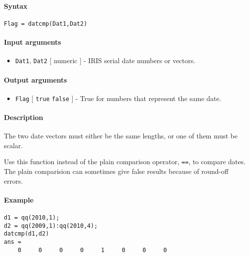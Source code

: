 


	\paragraph{Syntax}

\begin{verbatim}
Flag = datcmp(Dat1,Dat2)
\end{verbatim}

\paragraph{Input arguments}

\begin{itemize}
\itemsep1pt\parskip0pt
\item
  \texttt{Dat1}, \texttt{Dat2} {[} numeric {]} - IRIS serial date
  numbers or vectors.
\end{itemize}

\paragraph{Output arguments}

\begin{itemize}
\itemsep1pt\parskip0pt
\item
  \texttt{Flag} {[} \texttt{true} \textbar{} \texttt{false} {]} - True
  for numbers that represent the same date.
\end{itemize}

\paragraph{Description}

The two date vectors must either be the same lengths, or one of them
must be scalar.

Use this function instead of the plain comparison operator, \texttt{==},
to compare dates. The plain comparision can sometimes give false results
because of round-off errors.

\paragraph{Example}

\begin{verbatim}
d1 = qq(2010,1);
d2 = qq(2009,1):qq(2010,4);
datcmp(d1,d2)
ans =
    0     0     0     0     1     0     0     0
\end{verbatim}


